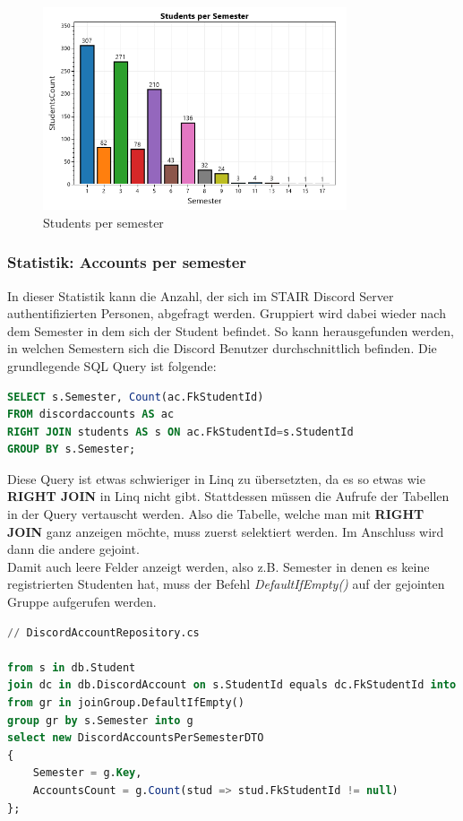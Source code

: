 \documentclass[a4paper, table]{article}
\begin{document}
\begin{figure}[h]
    \centering
    \includegraphics[width=0.8\textwidth]{img/studentsPerSemester.png}
    \caption{Students per semester}
    \label{fig:students-per-semester}
\end{figure}

\newpage
\subsubsection*{Statistik: Accounts per semester}
In dieser Statistik kann die Anzahl, der sich im STAIR Discord Server authentifizierten Personen, abgefragt werden.
Gruppiert wird dabei wieder nach dem Semester in dem sich der Student befindet.
So kann herausgefunden werden, in welchen Semestern sich die Discord Benutzer durchschnittlich befinden.
Die grundlegende SQL Query ist folgende:

\begin{lstlisting}[language=SQL]
SELECT s.Semester, Count(ac.FkStudentId)
FROM discordaccounts AS ac
RIGHT JOIN students AS s ON ac.FkStudentId=s.StudentId
GROUP BY s.Semester;
\end{lstlisting}

Diese Query ist etwas schwieriger in Linq zu übersetzten, da es so etwas wie \textbf{RIGHT JOIN} in Linq nicht gibt.
Stattdessen müssen die Aufrufe der Tabellen in der Query vertauscht werden.
Also die Tabelle, welche man mit \textbf{RIGHT JOIN} ganz anzeigen möchte, muss zuerst selektiert werden.
Im Anschluss wird dann die andere gejoint.\\
Damit auch leere Felder anzeigt werden, also \gls{z.B.} Semester in denen es keine registrierten Studenten hat, 
muss der Befehl \textit{DefaultIfEmpty()} auf der gejointen Gruppe aufgerufen werden.

\begin{lstlisting}[language=SQL]
// DiscordAccountRepository.cs

from s in db.Student
join dc in db.DiscordAccount on s.StudentId equals dc.FkStudentId into joinGroup
from gr in joinGroup.DefaultIfEmpty()
group gr by s.Semester into g
select new DiscordAccountsPerSemesterDTO
{
    Semester = g.Key,
    AccountsCount = g.Count(stud => stud.FkStudentId != null)
};
\end{lstlisting}
\end{document}

